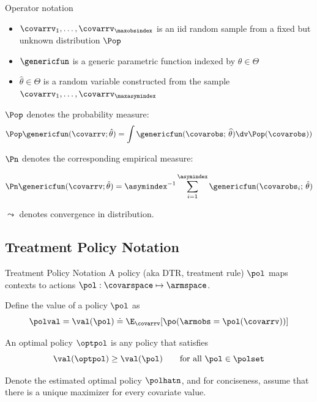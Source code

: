 \documentclass[aspectratio=169, professionalfonts]{beamer}
\begin{document}
\begin{frame}{Operator notation}
	\begin{itemize}
		\item $\covarrv_1, \ldots, \covarrv_{\maxobsindex}$ is an iid random sample from a
		      fixed but unknown distribution $\Pop$
		\item $\genericfun$ is a generic parametric function indexed by $\theta \in \Theta$
		\item $\hat{\theta} \in \Theta$ is a random variable constructed from the sample
		      $\covarrv_1, \ldots, \covarrv_{\maxasymindex}$
	\end{itemize}
	\vfill \pause

	$\Pop$ denotes the probability measure:
	\begin{equation*}
		\Pop \genericfun(\covarrv; \hat{\theta}) = \int \genericfun(\covarobs;\,\widehat{\theta}) \dv
		\Pop(\covarobs))
	\end{equation*}

	\vfill \pause $\Pn$ denotes the corresponding empirical measure:

	\begin{equation*}
		\Pn \genericfun(\covarrv; \hat{\theta}) = \asymindex^{-1}\sum_{i =
			1}^{\asymindex} \genericfun(\covarobs_{i};\,\hat{\theta})
	\end{equation*}
	\vfill \pause

	$\leadsto$ denotes convergence in distribution.

	\vfill
\end{frame}

\subsection{Treatment Policy Notation}

\begin{frame}{Treatment Policy Notation}
	A policy (aka DTR, treatment rule) $\pol$ maps contexts to actions $\pol:
		\covarspace \mapsto \armspace$.

	\vfill \pause
	Define the value of a policy $\pol$ as
	\begin{equation}
		\polval = \val(\pol) \doteq \E_{\covarrv}[\po(\armobs = \pol(\covarrv))]
	\end{equation}

	\vfill \pause
	An optimal policy $\optpol$ is any policy that satisfies
	\begin{equation}
		\val(\optpol) \geq \val(\pol) \qquad \text{for all }\pol \in \polset
	\end{equation}

	\vfill \pause
	Denote the estimated optimal policy $\polhatn$, and for conciseness, assume
	that there is a unique maximizer for every covariate value.

\end{frame}
\end{document}

